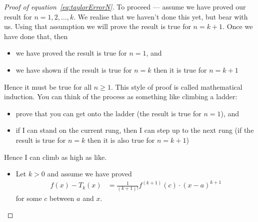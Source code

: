 \begin{proof}[Proof of equation~\eqref{eq:taylorErrorN}]
To proceed --- assume we have proved our result for $n=1,2,\dots, k$. We realise
that we haven't done this yet, but bear with us. Using that assumption we will
prove the result is true for $n=k+1$. Once we have done that, then
\begin{itemize}
 \item we have proved the result is true for $n=1$, and
\item we have shown if the result is true for $n=k$ then it is true for $n=k+1$
\end{itemize}
Hence it must be true for all $n \geq 1$. This style of proof is called
mathematical induction. You can think of the process as something like climbing
a ladder:
\begin{itemize}
 \item prove that you can get onto the ladder (the result is true for $n=1$),
and
\item if I can stand on the current rung, then I can step up to the next rung (if the
result is true for $n=k$ then it is also true for $n=k+1$)
\end{itemize}
Hence I can climb as high as like.



\begin{itemize}
 \item Let $k>0$ and assume we have proved
\begin{align*}
  f(x) - T_k(x) &= \frac{1}{(k+1)!} f^{(k+1)}(c) \cdot (x-a)^{k+1}
\end{align*}
for some $c$ between $a$ and $x$.


\end{itemize}
\end{proof}
